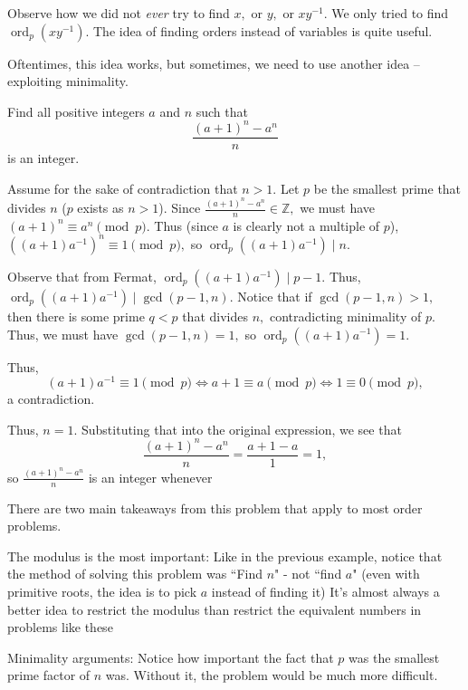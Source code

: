 \documentclass[mast]{lucky}
\begin{document}
Observe how we did not \emph{ever} try to find $x,$ or $y,$ or $xy^{-1}.$ We only tried to find $\operatorname{ord}_p(xy^{-1}).$ The idea of finding orders instead of variables is quite useful.

Oftentimes, this idea works, but sometimes, we need to use another idea -- exploiting minimality.

\begin{exam}
Find all positive integers $a$ and $n$ such that $$\frac{(a+1)^n - a^n}{n}$$ is an integer.
\end{exam}

\begin{sol}
Assume for the sake of contradiction that $n>1.$ Let $p$ be the smallest prime that divides $n$ ($p$ exists as $n>1$). Since $\frac{(a+1)^n - a^n}{n} \in \mathbb{Z},$ we must have $(a+1)^{n} \equiv a^{n} \pmod{p}.$ Thus (since $a$ is clearly not a multiple of $p$), $((a+1)a^{-1})^{n} \equiv 1 \pmod{p},$ so $\operatorname{ord}_p((a+1)a^{-1}) \mid n.$

Observe that from Fermat, $\operatorname{ord}_p((a+1)a^{-1}) \mid p-1.$ Thus, $\operatorname{ord}_p((a+1)a^{-1}) \mid \gcd(p-1, n).$ Notice that if $\gcd(p-1, n) > 1,$ then there is some prime $q < p$ that divides $n,$ contradicting minimality of $p.$ Thus, we must have $\gcd(p-1, n) = 1,$ so $\operatorname{ord}_p((a+1)a^{-1}) = 1.$

Thus, $$(a+1)a^{-1} \equiv 1 \pmod{p} \Longleftrightarrow a+1 \equiv a \pmod{p} \Longleftrightarrow 1 \equiv 0 \pmod{p},$$ a contradiction.

Thus, $n = 1.$ Substituting that into the original expression, we see that $$\frac{(a+1)^n-a^n}{n} = \frac{a+1-a}{1} = 1,$$ so $\frac{(a+1)^n-a^n}{n}$ is an integer whenever 
\end{sol}

There are two main takeaways from this problem that apply to most order problems.

\begin{itemize}
\Item The modulus is the most important: Like in the previous example, notice that the method of solving this problem was ``Find $n$" - not ``find $a$" (even with primitive roots, the idea is to pick $a$ instead of finding it) It's almost always a better idea to restrict the modulus than restrict the equivalent numbers in problems like these

\Item Minimality arguments: Notice how important the fact that $p$ was the smallest prime factor of $n$ was. Without it, the problem would be much more difficult.
\end{itemize}
\end{document}
